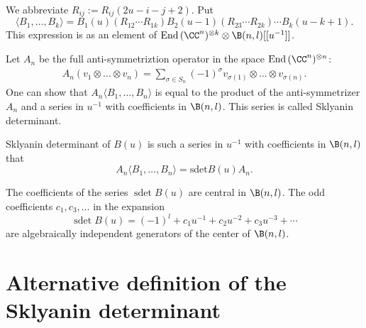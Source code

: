 We abbreviate  $R_{ij}:=R_{ij}(2u-i-j+2)$.
Put
\[
\langle B_1,\dots, B_k\rangle =B_1(u)(R_{12}\cdots R_{1k})B_2(u-1) (R_{23}\cdots R_{2k})
\cdots B_ k(u-k+1).
\]
This expression  is as an  element of $\text{End}\, (\CC^n)^{\otimes k }\otimes \B(n,l)[[u^{-1}]]$.

Let $A_n$ be the full  anti-symmetriztion operator in the space $\text{End}\, (\CC^n)^{\otimes n }$:
\begin{gather*}
A_n (v_1\otimes \dots\otimes v_n)=\sum_{\sigma\in S_n} (-1)^{\sigma}
v_{\sigma(1)}\otimes \dots \otimes v_{\sigma(n)}.
\end{gather*}
One can show \cite{MR} that $A_n\langle B_1,\dots, B_n\rangle $ is equal to the product of the anti-symmetrizer $A_n$ and a series in $u^{-1}$   with coef\/f\/icients in $\B(n,l)$. This series is called Sklyanin determinant.

\begin{definition} Sklyanin determinant of $B(u)$ is such a  series in $u^{-1}$   with coef\/f\/icients in $\B(n,l)$ that
\[
 A_n \langle B_1,\dots, B_n\rangle =\text{sdet} B(u)A_n.
 \]
 \end{definition}
\begin{proposition}[\cite {MR}]\label{MR} The coefficients of the series $\operatorname{sdet}B(u)$ are  central in $\B(n,l)$. The odd coefficients $c_1,c_3,\dots$ in the expansion
\[
\operatorname{sdet} B(u)=(-1)^l+c_1u^{-1}+c_2u^{-2}+c_3u^{-3}+\cdots
\]
 are algebraically independent generators of the center of  $\B(n,l)$.
 \end{proposition}

\section{Alternative def\/inition of  the Sklyanin determinant}\label{section2}

